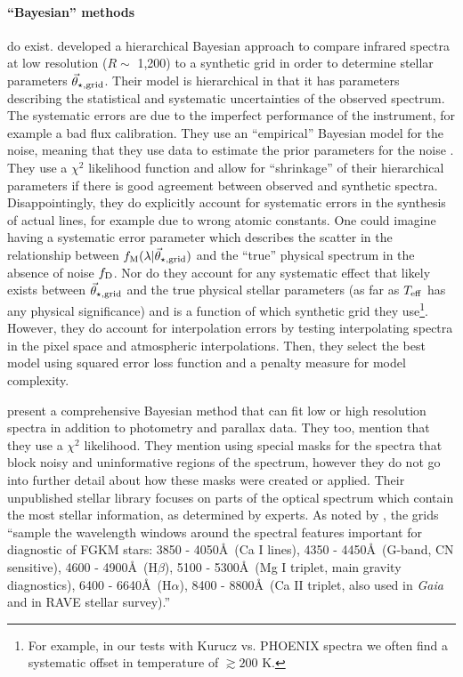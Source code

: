\documentclass[preprint]{aastex} %
\newcommand{\vt}{\vec{\theta}}
\newcommand{\vg}{\vt_{\star, {\rm grid}}}
\newcommand{\fM}{f_{\rm M}}
\newcommand{\fD}{f_{\rm D}}
\begin{document}
\paragraph{``Bayesian'' methods} do exist. \citet{sdm+07} developed a hierarchical Bayesian approach to compare infrared spectra at low resolution ($R \sim $ 1,200) to a synthetic grid in order to determine stellar parameters $\vg$. Their model is hierarchical in that it has parameters describing the statistical and systematic uncertainties of the observed spectrum. The systematic errors are due to the imperfect performance of the instrument, for example a bad flux calibration. They use an ``empirical'' Bayesian model for the noise, meaning that they use data to estimate the prior parameters for the noise \citep{gcs+04}. They use a $\chi^2$ likelihood function and allow for ``shrinkage'' of their hierarchical parameters if there is good agreement between observed and synthetic spectra. Disappointingly, they do explicitly account for systematic errors in the synthesis of actual lines, for example due to wrong atomic constants. One could imagine having a systematic error parameter which describes the scatter in the relationship between $\fM(\lambda | \vg)$ and the ``true'' physical spectrum in the absence of noise $\fD$. Nor do they account for any systematic effect that likely exists between $\vg$ and the true physical stellar parameters (as far as $T_{\rm eff}$ has any physical significance) and is a function of which synthetic grid they use\footnote{For example, in our tests with Kurucz vs. PHOENIX spectra we often find a systematic offset in temperature of $\gtrsim 200$ K.}. However, they do account for interpolation errors by testing interpolating spectra in the pixel space and atmospheric interpolations. Then, they select the best model using squared error loss function and a penalty measure for model complexity.

\citet{sb13} present a comprehensive Bayesian method that can fit low or high resolution spectra in addition to photometry and parallax data. They too, mention that they use a $\chi^2$ likelihood. They mention using special masks for the spectra that block noisy and uninformative regions of the spectrum, however they do not go into further detail about how these masks were created or applied. Their unpublished stellar library focuses on parts of the optical spectrum which contain the most stellar information, as determined by experts. As noted by \citet{sb13}, the grids ``sample the wavelength windows around the spectral features important for diagnostic of FGKM stars: 3850 - 4050\AA\ (Ca I lines), 4350 - 4450\AA\ (G-band, CN sensitive), 4600 - 4900\AA\ (H$\beta$), 5100 - 5300\AA\ (Mg I triplet, main gravity diagnostics), 6400 - 6640\AA\ (H$\alpha$), 8400 - 8800\AA\ (Ca II triplet, also used in \emph{Gaia} and in RAVE stellar survey).'' 
\end{document}

